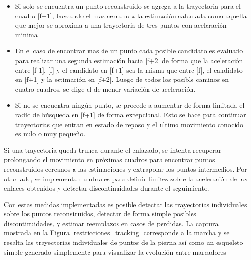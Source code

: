 \begin{itemize}

\item Si solo se encuentra un punto reconstruido se agrega a la trayectoria para el cuadro [f+1], buscando el mas cercano a la estimación calculada como aquella que mejor se aproxima a una trayectoria de tres puntos con aceleración mínima

\item En el caso de encontrar mas de un punto cada posible candidato es evaluado para realizar una segunda estimación hacia [f+2] de forma que la aceleración entre [f-1], [f] y el candidato en [f+1] sea la misma que entre [f], el candidato en [f+1] y la estimación en [f+2]. Luego de todos los posible caminos en cuatro cuadros, se elige el de menor variación de aceleración.

\item Si no se encuentra ningún punto, se procede a aumentar de forma limitada el radio de búsqueda en [f+1] de forma excepcional. Esto se hace para continuar trayectorias que entran en estado de reposo y el ultimo movimiento conocido es nulo o muy pequeño.

\end{itemize}

Si una trayectoria queda trunca durante el enlazado, se intenta recuperar prolongando el movimiento en próximas cuadros para encontrar puntos reconstruidos cercanos a las estimaciones y extrapolar los puntos intermedios. Por otro lado, se implementan umbrales para definir limites sobre la aceleración de los enlaces obtenidos y detectar discontinuidades durante el seguimiento.

Con estas medidas implementadas es posible detectar las trayectorias individuales sobre los puntos reconstruidos, detectar de forma simple posibles discontinuidades, y estimar reemplazos en casos de perdidas. La captura mostrada en la Figura \ref{restricciones_tracking} corresponde a la marcha y se resalta las trayectorias individuales de puntos de la pierna así como un esqueleto simple generado simplemente para visualizar la evolución entre marcadores

